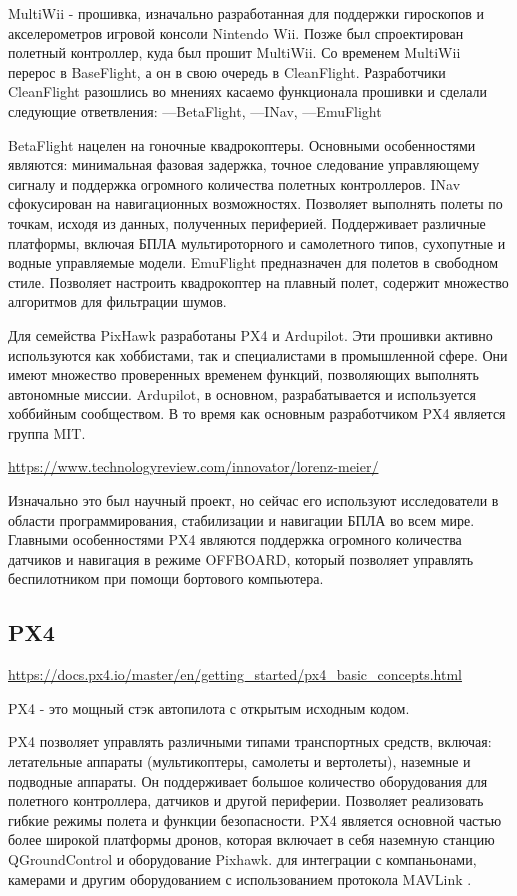 MultiWii - прошивка, изначально разработанная для поддержки гироскопов и акселерометров игровой консоли Nintendo Wii. Позже был спроектирован полетный контроллер, куда был прошит MultiWii. Со временем MultiWii перерос в BaseFlight, а он в свою очередь в CleanFlight. Разработчики CleanFlight разошлись во мнениях касаемо функционала прошивки и сделали следующие ответвления:
---BetaFlight,
---INav,
---EmuFlight

BetaFlight нацелен на гоночные квадрокоптеры. Основными особенностями являются: минимальная фазовая задержка, точное следование управляющему сигналу и поддержка огромного количества полетных контроллеров.
INav сфокусирован на навигационных возможностях. Позволяет выполнять полеты по точкам, исходя из данных, полученных периферией. Поддерживает различные платформы, включая БПЛА мультироторного и самолетного типов, сухопутные и водные управляемые модели.
EmuFlight предназначен для полетов в свободном стиле. Позволяет настроить квадрокоптер на плавный полет, содержит множество алгоритмов для фильтрации шумов.

Для семейства PixHawk разработаны PX4 и Ardupilot. Эти прошивки активно используются как хоббистами, так и специалистами в промышленной сфере. Они имеют множество проверенных временем функций, позволяющих выполнять автономные миссии. Ardupilot, в основном, разрабатывается и используется хоббийным сообществом. В то время как основным разработчиком PX4 является группа MIT.

\url{https://www.technologyreview.com/innovator/lorenz-meier/}

Изначально это был научный проект, но сейчас его используют исследователи в области программирования, стабилизации и навигации БПЛА во всем мире. Главными особенностями PX4 являются поддержка огромного количества датчиков и навигация в режиме OFFBOARD, который позволяет управлять беспилотником при помощи бортового компьютера.


\subsection{PX4}
\url{https://docs.px4.io/master/en/getting_started/px4_basic_concepts.html}

PX4 - это мощный стэк автопилота с открытым исходным кодом.

PX4 позволяет управлять различными типами транспортных средств, включая: летательные аппараты (мультикоптеры, самолеты и вертолеты), наземные и подводные аппараты. Он поддерживает большое количество оборудования для полетного контроллера, датчиков и другой периферии.
Позволяет реализовать гибкие режимы полета и функции безопасности.
PX4 является основной частью более широкой платформы дронов, которая включает в себя наземную станцию QGroundControl и оборудование Pixhawk. для интеграции с компаньонами, камерами и другим оборудованием с использованием протокола MAVLink
. 

